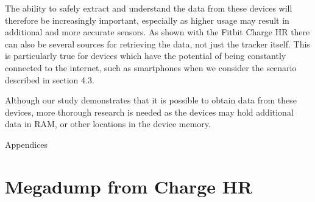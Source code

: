 \documentclass[a4paper,11pt,dvips]{article}
\begin{document}
The ability to safely extract and understand the data from these devices will therefore be increasingly important, especially as higher usage may result in additional and more accurate sensors. As shown with the Fitbit Charge HR there can also be several sources for retrieving the data, not just the tracker itself. This is particularly true for devices which have the potential of being constantly connected to the internet, such as smartphones when we consider the scenario described in section 4.3.  

Although our study demonstrates that it is possible to obtain data from these devices, more thorough research is needed as the devices may hold additional data in RAM, or other locations in the device memory. 




\newpage
\appendix
\noindent
\Huge{Appendices}
\normalsize
\section{Megadump from Charge HR}\label{app:megadump}
\end{document}
